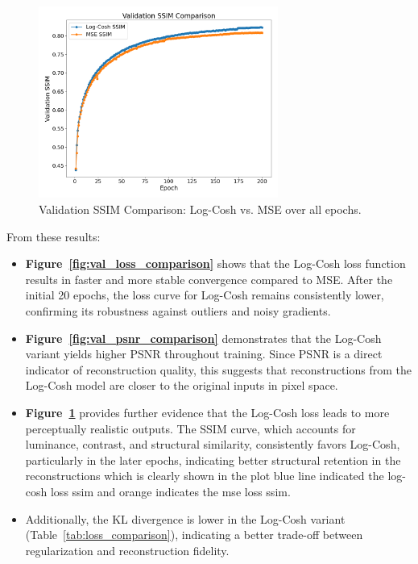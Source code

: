 \begin{figure}[h]
    \centering
    \includegraphics[width=0.7\textwidth]{img/vae_results/val_ssim_comparison.png}
    \caption{Validation SSIM Comparison: Log-Cosh vs. MSE over all epochs.}
    \label{fig:val_ssim_comparison}
\end{figure}

From these results:

\begin{itemize}
    \item \textbf{Figure~\ref{fig:val_loss_comparison}} shows that the Log-Cosh loss function results in faster and more stable convergence compared to MSE. After the initial 20 epochs, the loss curve for Log-Cosh remains consistently lower, confirming its robustness against outliers and noisy gradients.

    \item \textbf{Figure~\ref{fig:val_psnr_comparison}} demonstrates that the Log-Cosh variant yields higher PSNR throughout training. Since PSNR is a direct indicator of reconstruction quality, this suggests that reconstructions from the Log-Cosh model are closer to the original inputs in pixel space.

    \item \textbf{Figure~\ref{fig:val_ssim_comparison}} provides further evidence that the Log-Cosh loss leads to more perceptually realistic outputs. The SSIM curve, which accounts for luminance, contrast, and structural similarity, consistently favors Log-Cosh, particularly in the later epochs, indicating better structural retention in the reconstructions which is clearly shown in the plot blue line indicated the log-cosh loss ssim and orange indicates the mse loss ssim.

    \item Additionally, the KL divergence is lower in the Log-Cosh variant (Table~\ref{tab:loss_comparison}), indicating a better trade-off between regularization and reconstruction fidelity.
\end{itemize}

